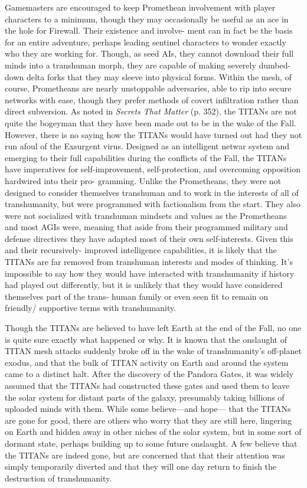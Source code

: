 Gamemasters are encouraged to keep Promethean 
involvement with player characters to a minimum, 
though they may occasionally be useful as an ace in 
the hole for Firewall. Their existence and involve-
ment can in fact be the basis for an entire adventure, 
perhaps leading sentinel characters to wonder exactly 
who they are working for. Though, as seed AIs, they 
cannot download their full minds into a transhuman 
morph, they are capable of making severely dumbed-
down delta forks that they may sleeve into physical 
forms. Within the mesh, of course, Prometheans are 
nearly unstoppable adversaries, able to rip into secure 
networks with ease, though they prefer methods of 
covert infiltration rather than direct subversion.
As noted in \textit{Secrets That Matter} (p. 352), the TITANs 
are not quite the bogeyman that they have been made 
out to be in the wake of the Fall. However, there is no 
saying how the TITANs would have turned out had 
they not run afoul of the Exsurgent virus. Designed as 
an intelligent netwar system and emerging to their full 
capabilities during the conflicts of the Fall, the TITANs 
have imperatives for self-improvement, self-protection, 
and overcoming opposition hardwired into their pro-
gramming. Unlike the Prometheans, they were not 
designed to consider themselves transhuman and to 
work in the interests of all of transhumanity, but were 
programmed with factionalism from the start. They 
also were not socialized with transhuman mindsets 
and values as the Prometheans and most AGIs were, 
meaning that aside from their programmed military 
and defense directives they have adapted most of their 
own self-interests. Given this and their recursively-
improved intelligence capabilities, it is likely that the 
TITANs are far removed from transhuman interests 
and modes of thinking. It's impossible to say how they 
would have interacted with transhumanity if history 
had played out differently, but it is unlikely that they 
would have considered themselves part of the trans-
human family or even seen fit to remain on friendly/
supportive terms with transhumanity.

Though the TITANs are believed to have left Earth 
at the end of the Fall, no one is quite sure exactly 
what happened or why. It is known that the onslaught 
of TITAN mesh attacks suddenly broke off in the 
wake of transhumanity's off-planet exodus, and that 
the bulk of TITAN activity on Earth and around the 
system came to a distinct halt. After the discovery 
of the Pandora Gates, it was widely assumed that 
the TITANs had constructed these gates and used 
them to leave the solar system for distant parts of 
the galaxy, presumably taking billions of uploaded 
minds with them. While some believe—and hope—
that the TITANs are gone for good, there are others 
who worry that they are still here, lingering on Earth 
and hidden away in other niches of the solar system, 
but in some sort of dormant state, perhaps building 
up to some future onslaught. A few believe that the 
TITANs are indeed gone, but are concerned that that 
their attention was simply temporarily diverted and 
that they will one day return to finish the destruction 
of transhumanity. 

